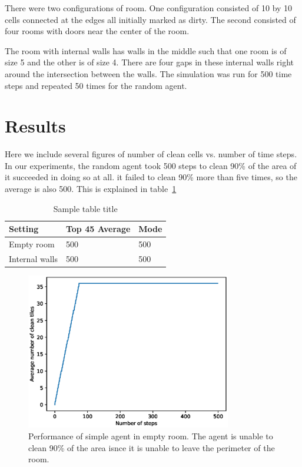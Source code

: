 \documentclass{article}
\begin{document}
There were two configurations of room. One configuration consisted of 10 by 10 cells connected at the edges  all initially marked as dirty. The second consisted of four rooms with doors near the center of the room. 


The room with internal walls has walls in the middle such that one room is of size 5 and the other is of size 4. There are four gaps in these internal walls right around the intersection between the walls.  The simulation was run for 500 time steps and repeated 50 times for the random agent. 




\section{Results}
Here we include several figures of number of clean cells vs. number of time steps.  In our experiments, the random agent took 500 steps to clean 90\% of the area of it succeeded in doing so at all. it failed to clean 90\% more than five times, so the average is also 500. This is explained in table~\ref{tab:randomPerf}


\begin{table}
  \caption{Sample table title}
  \label{tab:randomPerf}
  \centering
  \begin{tabular}{lll}
    \toprule
    Setting     & Top 45 Average     & Mode \\
    \midrule
    Empty room &  500 & 500    \\
    Internal walls     & 500 & 500     \\
    \bottomrule
  \end{tabular}
\end{table}

\begin{figure}[h!]
  \centering

  \includegraphics[width=0.8\textwidth]{SimpleNoWallPerformance}
  \caption{Performance of simple agent in empty room. The agent is unable to clean 90\% of the area isnce it is unable to leave the perimeter of the room. }
  \label{fig:SimpleNoWall}
\end{figure}
\end{document}
